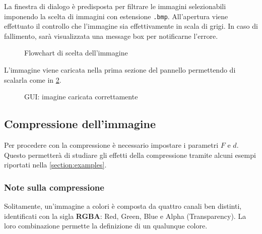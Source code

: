 \documentclass[11pt,italian]{article}
\begin{document}
La finestra di dialogo è predisposta per filtrare le immagini selezionabili imponendo la scelta di immagini con estensione \lstinline{.bmp}. All'apertura viene effettuato il controllo che l'immagine sia effettivamente in scala di grigi. In caso di fallimento, sarà visualizzata una message box per notificarne l'errore.

\begin{figure}[H]
    \caption{Flowchart di scelta dell'immagine}
    \label{fig:flow-image-pick}
\end{figure}

\noindent
L’immagine viene caricata nella prima sezione del pannello permettendo di scalarla come in \cref{fig:application-image-loaded}.
\begin{figure}[H]
    \caption{GUI: imagine caricata correttamente}
    \label{fig:application-image-loaded}
\end{figure}

\subsection{Compressione dell'immagine}
Per procedere con la compressione è necessario impostare i parametri $F$ e $d$. Questo permetterà di studiare gli effetti della compressione tramite alcuni esempi riportati nella \cref{section:examples}.

\subsubsection*{Note sulla compressione}
Solitamente, un’immagine a colori è composta da quattro canali ben distinti, identificati con la sigla \textbf{RGBA}: Red, Green, Blue e Alpha (Transparency).
La loro combinazione permette la definizione di un qualunque colore.
\end{document}
